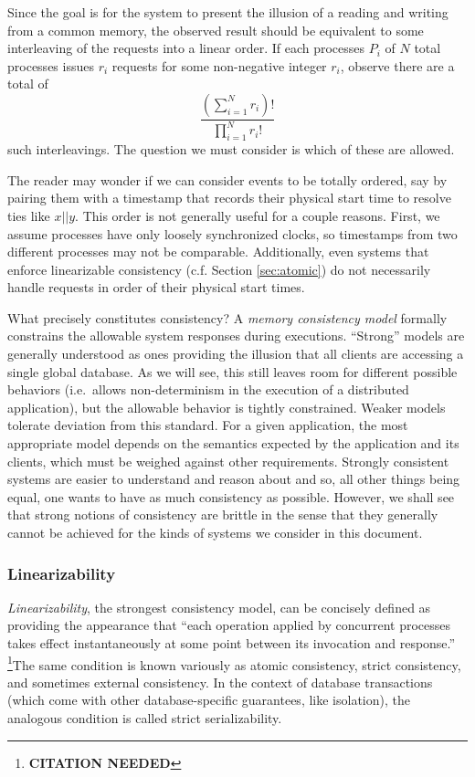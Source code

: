 \documentclass[]             %
{NASA}                       %
\theoremstyle{definition}
\newcommand{\citationneeded}{\footnote{\textbf{CITATION NEEDED}}}
\begin{document}
Since the goal is for the system to present the illusion of a reading
and writing from a common memory, the observed result should be
equivalent to some interleaving of the requests into a linear
order. If each processes $P_i$ of $N$ total processes issues $r_i$
requests for some non-negative integer $r_i$, observe there are a
total of
\[
\frac{\left(\sum_{i = 1}^N r_i\right)!}{\prod_{i = 1}^N r_i!}
\]
such interleavings. The question we must consider is which of these
are allowed.

The reader may wonder if we can consider events to be totally ordered,
say by pairing them with a timestamp that records their physical start
time to resolve ties like \(x || y\). This order is not generally useful
for a couple reasons. First, we assume processes have only loosely
synchronized clocks, so timestamps from two different processes may not
be comparable. Additionally, even systems that enforce linearizable
consistency (c.f. Section \ref{sec:atomic}) do not necessarily handle
requests in order of their physical start times.



What precisely constitutes consistency? A \emph{memory consistency
model} formally constrains the allowable system responses during
executions. ``Strong'' models are generally understood as ones
providing the illusion that all clients are accessing a single global
database. As we will see, this still leaves room for different
possible behaviors (i.e.~allows non-determinism in the execution of a
distributed application), but the allowable behavior is tightly
constrained.  Weaker models tolerate deviation from this standard. For
a given application, the most appropriate model depends on the
semantics expected by the application and its clients, which must be
weighed against other requirements. Strongly consistent systems are
easier to understand and reason about and so, all other things being
equal, one wants to have as much consistency as possible. However, we
shall see that strong notions of consistency are brittle in the sense
that they generally cannot be achieved for the kinds of systems we
consider in this document.

\subsubsection{Linearizability}
\label{sssec:linearizability}

\emph{Linearizability}, the strongest consistency model, can be
concisely defined as providing the appearance that ``each operation
applied by concurrent processes takes effect instantaneously at some
point between its invocation and response.'' \citationneeded The same
condition is known variously as atomic consistency, strict
consistency, and sometimes external consistency. In the context of
database transactions (which come with other database-specific
guarantees, like isolation), the analogous condition is called strict
serializability.
\end{document}
